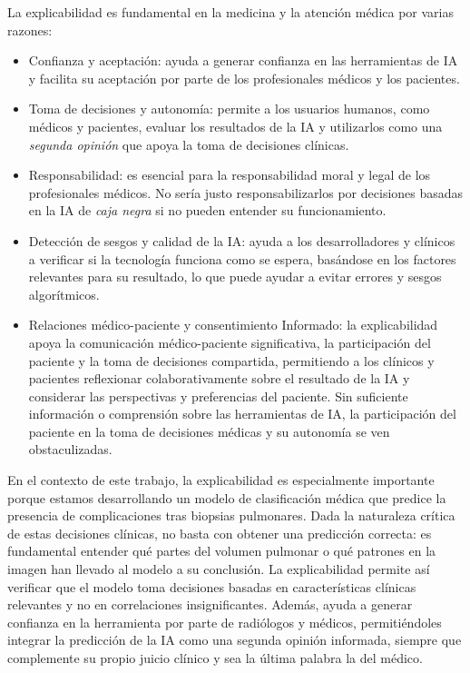 La explicabilidad es fundamental en la medicina y la atención médica por varias razones:
\begin{itemize}
    \item Confianza y aceptación: ayuda a generar confianza en las herramientas de IA y facilita su aceptación por parte de los profesionales médicos y los pacientes.
    \item Toma de decisiones y autonomía: permite a los usuarios humanos, como médicos y pacientes, evaluar los resultados de la IA y utilizarlos como una \textit{segunda opinión} que apoya la toma de decisiones clínicas. 
    \item Responsabilidad: es esencial para la responsabilidad moral y legal de los profesionales médicos. No sería justo responsabilizarlos por decisiones basadas en la IA de \textit{caja negra} si no pueden entender su funcionamiento.
    \item Detección de sesgos y calidad de la IA: ayuda a los desarrolladores y clínicos a verificar si la tecnología funciona como se espera, basándose en los factores relevantes para su resultado, lo que puede ayudar a evitar errores y sesgos algorítmicos.
    \item Relaciones médico-paciente y consentimiento Informado: la explicabilidad apoya la comunicación médico-paciente significativa, la participación del paciente y la toma de decisiones compartida, permitiendo a los clínicos y pacientes reflexionar colaborativamente sobre el resultado de la IA y considerar las perspectivas y preferencias del paciente. Sin suficiente información o comprensión sobre las herramientas de IA, la participación del paciente en la toma de decisiones médicas y su autonomía se ven obstaculizadas.
\end{itemize}


En el contexto de este trabajo, la explicabilidad es especialmente importante porque estamos desarrollando un modelo de clasificación médica que predice la presencia de complicaciones tras biopsias pulmonares. Dada la naturaleza crítica de estas decisiones clínicas, no basta con obtener una predicción correcta: es fundamental entender qué partes del volumen pulmonar o qué patrones en la imagen han llevado al modelo a su conclusión. La explicabilidad permite así verificar que el modelo toma decisiones basadas en características clínicas relevantes y no en correlaciones insignificantes. Además, ayuda a generar confianza en la herramienta por parte de radiólogos y médicos, permitiéndoles integrar la predicción de la IA como una segunda opinión informada, siempre que complemente su propio juicio clínico y sea la última palabra la del médico.

